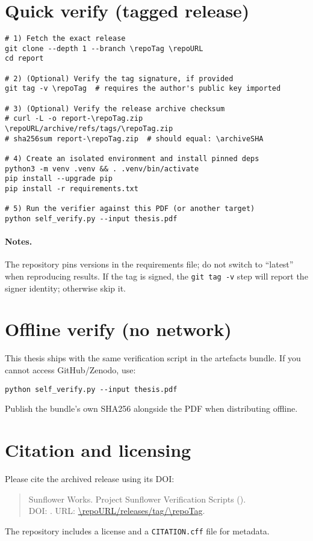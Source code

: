 \documentclass[12pt,a4paper,openright]{book}
\begin{document}
    \section*{Quick verify (tagged release)}
\begin{verbatim}
# 1) Fetch the exact release
git clone --depth 1 --branch \repoTag \repoURL
cd report

# 2) (Optional) Verify the tag signature, if provided
git tag -v \repoTag  # requires the author's public key imported

# 3) (Optional) Verify the release archive checksum
# curl -L -o report-\repoTag.zip \repoURL/archive/refs/tags/\repoTag.zip
# sha256sum report-\repoTag.zip  # should equal: \archiveSHA

# 4) Create an isolated environment and install pinned deps
python3 -m venv .venv && . .venv/bin/activate
pip install --upgrade pip
pip install -r requirements.txt

# 5) Run the verifier against this PDF (or another target)
python self_verify.py --input thesis.pdf
\end{verbatim}

    \paragraph{Notes.}
    The repository pins versions in the requirements file; do not switch to ``latest'' when reproducing results. If the tag is signed, the \texttt{git tag -v} step will report the signer identity; otherwise skip it.

    \section*{Offline verify (no network)}
    This thesis ships with the same verification script in the artefacts bundle. If you cannot access GitHub/Zenodo, use:
\begin{verbatim}
python self_verify.py --input thesis.pdf
\end{verbatim}
    Publish the bundle’s own SHA256 alongside the PDF when distributing offline.

    \section*{Citation and licensing}
    Please cite the archived release using its DOI:
    \begin{quote}\small
    Sunflower Works.
    Project Sunflower Verification Scripts (\repoTag).\\
    DOI: \repoDOI. URL: \url{\repoURL/releases/tag/\repoTag}.
    \end{quote}
    The repository includes a license and a \texttt{CITATION.cff} file for metadata.
\end{document}
